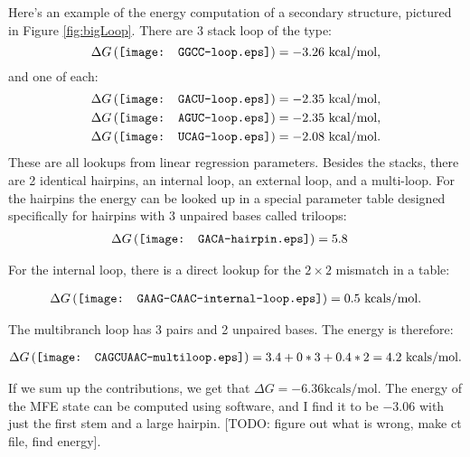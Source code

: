 Here's an example of the energy computation of a secondary structure,
pictured in Figure \ref{fig:bigLoop}. There are 3 stack loop of the type:
\begin{equation}
  \Delta G \left ( \vcenter{\hbox{\texttt{[image: GGCC-loop.eps]}}}
  \right ) = -3.26 \text{ kcal/mol},
\end{equation}
and one of each:
\begin{align}
  &\Delta G \left ( \vcenter{\hbox{\texttt{[image: GACU-loop.eps]}}}
  \right ) = -2.35 \text{ kcal/mol},\\ 
  &\Delta G \left ( \vcenter{\hbox{\texttt{[image: AGUC-loop.eps]}}}
  \right ) = -2.35 \text{ kcal/mol},\\
  &\Delta G \left ( \vcenter{\hbox{\texttt{[image: UCAG-loop.eps]}}}
  \right ) = -2.08 \text{ kcal/mol}.
\end{align}
These are all lookups from linear regression parameters. Besides the
stacks, there are 2 identical hairpins, an internal loop, an external
loop, and a multi-loop. For the hairpins the energy can be looked up
in a special parameter table designed specifically for hairpins with 3
unpaired bases called triloops:
\begin{align}
  \Delta G \left ( \vcenter{\hbox{\texttt{[image: GACA-hairpin.eps]}}}
  \right ) &= 5.8
\end{align}

For the internal loop, there is a direct lookup for the $2 \times 2$
mismatch in a table:

\begin{align}
  \Delta G \left ( \vcenter{\hbox{\texttt{[image: GAAG-CAAC-internal-loop.eps]}}}
  \right ) = 0.5 \text{ kcals/mol}.
\end{align}

The multibranch loop has 3 pairs and 2 unpaired bases. The energy is therefore:

\begin{align}
  \Delta G \left (\vcenter{\hbox{\texttt{[image: CAGCUAAC-multiloop.eps]}}}
  \right ) = 3.4 + 0*3 + 0.4*2 = 4.2 \text{ kcals/mol}.
\end{align}

If we sum up the contributions, we get that $\Delta G = -6.36 \text{
  kcals/mol}$. The energy of the MFE state can be computed using
software, and I find it to be $-3.06$ with just the first stem and a
large hairpin. [TODO: figure out what is wrong, make ct file, find energy].

